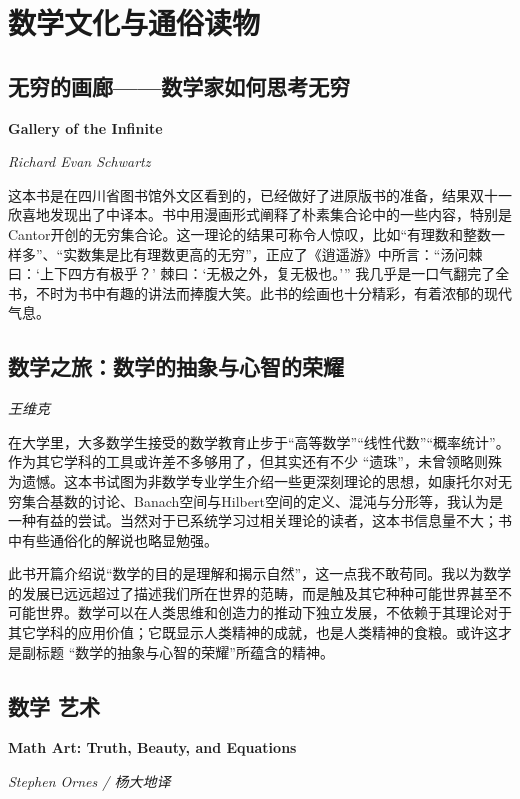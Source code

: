 
\section{数学文化与通俗读物}
\subsection*{无穷的画廊——数学家如何思考无穷}
\par \textbf{Gallery of the Infinite}
\par \emph{Richard Evan Schwartz} 
\par 这本书是在四川省图书馆外文区看到的，已经做好了进原版书的准备，结果双十一欣喜地发现出了中译本。书中用漫画形式阐释了朴素集合论中的一些内容，特别是Cantor开创的无穷集合论。这一理论的结果可称令人惊叹，比如“有理数和整数一样多”、“实数集是比有理数更高的无穷”，正应了《逍遥游》中所言：“汤问棘曰：‘上下四方有极乎？’ 棘曰：‘无极之外，复无极也。’” 我几乎是一口气翻完了全书，不时为书中有趣的讲法而捧腹大笑。此书的绘画也十分精彩，有着浓郁的现代气息。
\par {}

\subsection*{数学之旅：数学的抽象与心智的荣耀}
\par \emph{王维克} 

\par 在大学里，大多数学生接受的数学教育止步于“高等数学”“线性代数”“概率统计”。作为其它学科的工具或许差不多够用了，但其实还有不少 “遗珠”，未曾领略则殊为遗憾。这本书试图为非数学专业学生介绍一些更深刻理论的思想，如康托尔对无穷集合基数的讨论、Banach空间与Hilbert空间的定义、混沌与分形等，我认为是一种有益的尝试。当然对于已系统学习过相关理论的读者，这本书信息量不大；书中有些通俗化的解说也略显勉强。
\par 此书开篇介绍说“数学的目的是理解和揭示自然”，这一点我不敢苟同。我以为数学的发展已远远超过了描述我们所在世界的范畴，而是触及其它种种可能世界甚至不可能世界。数学可以在人类思维和创造力的推动下独立发展，不依赖于其理论对于其它学科的应用价值；它既显示人类精神的成就，也是人类精神的食粮。或许这才是副标题 “数学的抽象与心智的荣耀”所蕴含的精神。
\par {}

\subsection*{数学 艺术}
\par \textbf{Math Art: Truth, Beauty, and Equations}
\par \emph{Stephen Ornes / 杨大地译} 

